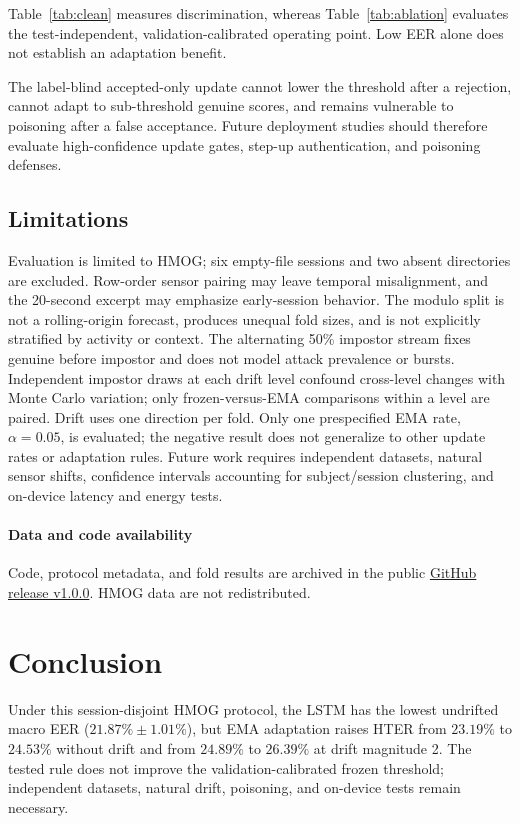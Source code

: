 \documentclass[3p,times,procedia]{elsarticle}
\begin{document}
Table~\ref{tab:clean} measures discrimination, whereas
Table~\ref{tab:ablation} evaluates the test-independent, validation-calibrated operating
point. Low EER alone does not establish an adaptation benefit.

The label-blind accepted-only update cannot lower the threshold after a rejection,
cannot adapt to sub-threshold genuine scores, and remains vulnerable to poisoning
after a false acceptance. Future deployment studies should therefore evaluate
high-confidence update gates, step-up authentication, and poisoning defenses.

\subsection{Limitations}

Evaluation is limited to HMOG; six empty-file sessions and two absent directories
are excluded. Row-order sensor pairing may leave temporal misalignment, and the
20-second excerpt may emphasize early-session behavior. The modulo split is not
a rolling-origin forecast, produces unequal fold sizes, and is not explicitly
stratified by activity or context. The alternating 50\% impostor stream fixes
genuine before impostor and does not model attack prevalence or bursts. Independent
impostor draws at each drift level confound cross-level changes with Monte Carlo
variation; only frozen-versus-EMA comparisons within a level are paired. Drift
uses one direction per fold. Only one prespecified EMA rate, $\alpha=0.05$, is
evaluated; the negative result does not generalize to other update rates or
adaptation rules. Future work requires independent datasets, natural sensor
shifts, confidence intervals accounting for subject/session clustering, and
on-device latency and energy tests.

\paragraph{Data and code availability} Code, protocol metadata, and fold results
are archived in the public
\href{https://github.com/madigali/continuous-mobile-authentication-hmog/releases/tag/v1.0.0}{GitHub release v1.0.0}.
HMOG data are not redistributed.

\section{Conclusion}

Under this session-disjoint HMOG protocol, the LSTM has the lowest undrifted
macro EER ($21.87\%\pm1.01\%$), but EMA adaptation raises HTER from $23.19\%$
to $24.53\%$ without drift and from $24.89\%$ to $26.39\%$ at drift magnitude 2.
The tested rule does not improve the validation-calibrated frozen threshold;
independent datasets, natural drift, poisoning, and on-device tests remain necessary.



\end{document}
